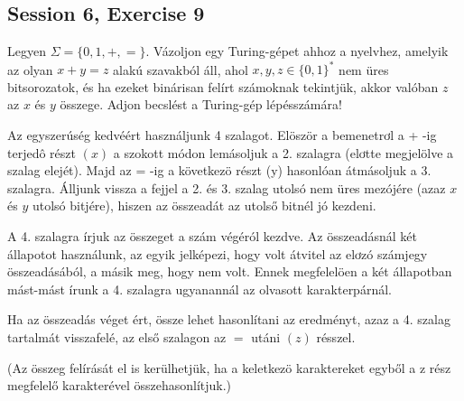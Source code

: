 \subsection{Session 6, Exercise 9}


Legyen $\Sigma=\{0,1,+,=\}$. Vázoljon egy Turing-gépet ahhoz a nyelvhez, amelyik az olyan $x+y=z$ alakú szavakból áll, ahol $x, y, z \in\{0,1\}^{*}$ nem üres bitsorozatok, és ha ezeket binárisan felírt számoknak tekintjük, akkor valóban $z$ az $x$ és $y$ összege. Adjon becslést a Turing-gép lépésszámára!


Az egyszerúség kedvéért használjunk 4 szalagot. Elöször a bemenetrơl a + -ig terjedô részt $(x)$ a szokott módon lemásoljuk a 2. szalagra (elơtte megjelölve a szalag elejét). Majd az = -ig a következö részt (y) hasonlóan átmásoljuk a 3. szalagra. Álljunk vissza a fejjel a 2. és 3. szalag utolsó nem üres mezójére (azaz $x$ és $y$ utolsó bitjére), hiszen az összeadát az utolső bitnél jó kezdeni.

A 4. szalagra írjuk az összeget a szám végéról kezdve. Az összeadásnál két állapotot használunk, az egyik jelképezi, hogy volt átvitel az elơzó számjegy összeadásából, a másik meg, hogy nem volt. Ennek megfelelöen a két állapotban mást-mást írunk a 4. szalagra ugyanannál az olvasott karakterpárnál.

Ha az összeadás véget ért, össze lehet hasonlítani az eredményt, azaz a 4. szalag tartalmát visszafelé, az első szalagon az $=$ utáni $(z)$ résszel.

(Az összeg felírását el is kerülhetjük, ha a keletkezö karaktereket egyből a z rész megfelelő karakterével összehasonlítjuk.)